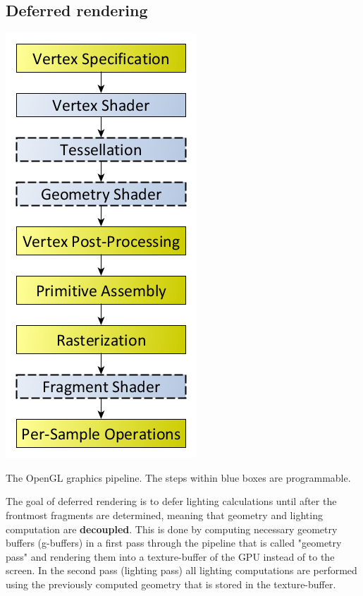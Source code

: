 \documentclass{ACGSeminar}
\begin{document}
	\subsection{Deferred rendering}
		\begin{floatingfigure}[r]{.3\textwidth}%
			\includegraphics[height=.4\textheight]{img/graphics_pipeline.png}
			\caption{The OpenGL graphics pipeline. The steps within blue boxes are programmable.}%
			\label{fig:graphics_pipeline}%
		\end{floatingfigure}%
		The goal of deferred rendering is to defer lighting calculations until after the frontmost fragments are determined, meaning that geometry and lighting computation are \textbf{decoupled}. This is done by computing necessary geometry buffers (g-buffers) in a first pass through the pipeline that is called "geometry pass" and rendering them into a texture-buffer of the GPU instead of to the screen. In the second pass (lighting pass) all lighting computations are performed using the previously computed geometry that is stored in the texture-buffer. \\\\
\end{document}
